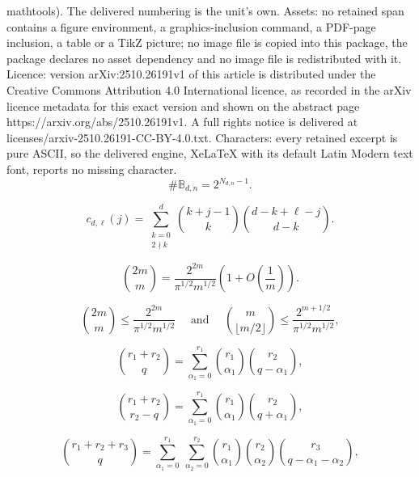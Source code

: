 \documentclass[10pt,a4paper]{amsart}
\renewcommand{\leq}{\leqslant}
\begin{document}
mathtools). The delivered numbering is the unit's own. Assets: no retained span contains a figure environment, a graphics-inclusion command, a PDF-page inclusion, a table or a TikZ picture; no image file is copied into this package, the package declares no asset dependency and no image file is redistributed with it. Licence: version arXiv:2510.26191v1 of this article is distributed under the Creative Commons Attribution 4.0 International licence, as recorded in the arXiv licence metadata for this exact version and shown on the abstract page https://arxiv.org/abs/2510.26191v1. A full rights notice is delivered at licenses/arxiv-2510.26191-CC-BY-4.0.txt. Characters: every retained excerpt is pure ASCII, so the delivered engine, XeLaTeX with its default Latin Modern text font, reports no missing character.
\begin{equation}
\label{Cardinality Bdn}
\# \mathbb{B}_{d,n} = 2^{N_{d,n}-1}.
\end{equation}

\begin{equation}
\label{Definition c}
c_{d,\ell}(j) = \sum_{\substack{k=0 \\ 2 \nmid k}}^d \binom{k+j-1}{k} \binom{d-k+\ell-j}{d-k}.
\end{equation}

\begin{equation}
\label{Estimate Stirling binom}
\binom{2m}{m} = \frac{2^{2m}}{\pi^{1/2} m^{1/2}} \left(1 + O \left( \frac1{m} \right) \right).
\end{equation}

\begin{equation}
\label{Upper bound Stirling binom}
\binom{2m}{m} \leq \frac{2^{2m}}{\pi^{1/2} m^{1/2}} \quad \text{ and } \quad 
\binom{m}{\lfloor m/2 \rfloor} \leq \frac{2^{m+1/2}}{\pi^{1/2} m^{1/2}},
\end{equation}

\begin{equation}
\label{Identity VDM}
\binom{r_1+r_2}{q} = \sum_{\alpha_1=0}^{r_1} \binom{r_1}{\alpha_1} \binom{r_2}{q-\alpha_1},
\end{equation}

\begin{equation}
\label{Identity VDM'}
\binom{r_1+r_2}{r_2-q} = \sum_{\alpha_1=0}^{r_1} \binom{r_1}{\alpha_1} \binom{r_2}{q+\alpha_1},
\end{equation}

\begin{equation}
\label{Identity VDM2}
\binom{r_1+r_2+r_3}{q} = \sum_{\alpha_1=0}^{r_1} \ \sum_{\alpha_2=0}^{r_2} \binom{r_1}{\alpha_1} \binom{r_2}{\alpha_2} \binom{r_3}{q-\alpha_1-\alpha_2},
\end{equation}
\end{document}
